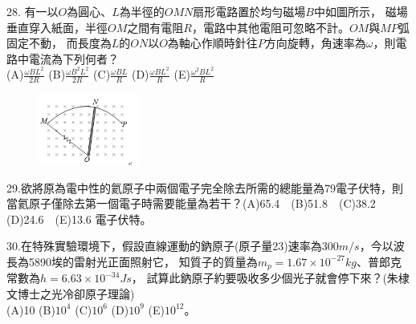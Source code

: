 \documentclass[cn,10pt,math=newtx]{elegantbook}
\begin{document}
\begin{example}
   28. 有一以$O$為圓心、$L$為半徑的$OMN$扇形電路置於均勻磁場$B$中如圖所示，
   磁場垂直穿入紙面，半徑$OM$之間有電阻$R$，電路中其他電阻可忽略不計。$OM$與$MP$弧固定不動，
   而長度為$L$的$ON$以$O$為軸心作順時針往$P$方向旋轉，角速率為$\omega$，則電路中電流為下列何者？\\
   (A)$\frac{\omega BL^2}{2R}$ (B)$\frac{\omega B^2 L^2}{2R}$ 
   (C)$\frac{\omega BL}{R}$ (D)$\frac{\omega BL^2}{R}$ (E)$\frac{\omega^2 BL^2}{R}$
   \\
    \rightline{[成德高中教甄109]}
\end{example}
\begin{solution}
    
\end{solution}
\begin{figure}[htbp]
    \flushright
    \includegraphics[width=0.3\textwidth]{image/109成德28.png}
  \end{figure}
\newpage


\begin{example}
   29.欲將原為電中性的氦原子中兩個電子完全除去所需的總能量為79電子伏特，則當氦原子僅除去第一個電子時需要能量為若干？(A)65.4　(B)51.8　(C)38.2　(D)24.6　(E)13.6 電子伏特。\\
    \rightline{[成德高中教甄109]}
\end{example}
\begin{solution}
    
\end{solution}

\newpage


\begin{example}
  30.在特殊實驗環境下，假設直線運動的鈉原子(原子量23)速率為$300m/s$，今以波長為5890埃的雷射光正面照射它，
  知質子的質量為$m_p=1.67 \times 10^{-27} kg$、普郎克常數為$h= 6.63 \times 10^{-34} Js$，
  試算此鈉原子約要吸收多少個光子就會停下來？(朱棣文博士之光冷卻原子理論)\\
  (A)10 (B)$10^4$ (C)$10^6$ (D)$10^9$ (E)$10^12$。 \\
    \rightline{[成德高中教甄109]}
\end{example}
\begin{solution}
    
\end{solution}
\end{document}
